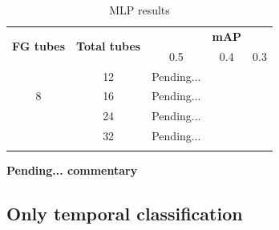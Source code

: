 \documentclass{report}
\begin{document}
\begin{center}
  \begin{longtable}{|| c | c || c c c ||}
    \hline
    \multirow{2}{*}{\textbf{FG tubes}} & \multirow{2}{*}{\textbf{Total tubes}} & {} & \textbf{mAP} & {} \\
    {} & {} & 0.5 & 0.4 & 0.3 \\
    \hline
    \multirow{3}{*}{8} & 12 & Pending...\\
    \cline{2-5}
    {} & 16 & Pending... \\
    \cline{2-5}
    {} & 24 & Pending... \\
    \cline{2-5}
    {} & 32 & Pending... \\
    \hline

  \caption{MLP results}
  \label{table:mlp_linear}
\end{longtable}
\end{center}
  

\textbf{Pending... commentary}

\subsection{Only temporal classification}
\end{document}
